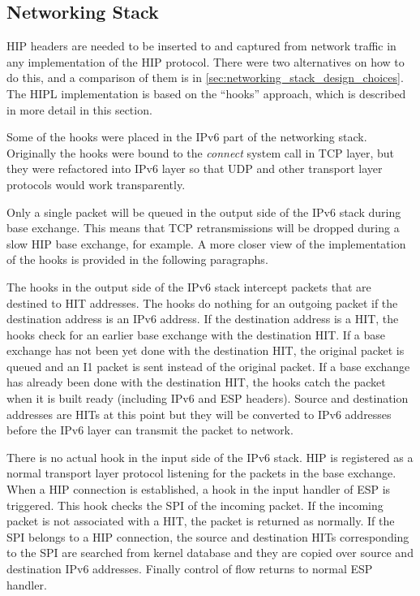 \subsection{Networking Stack}
\label{sec:networking_stack_architecture}

HIP headers are needed to be inserted to and captured from network
traffic in any implementation of the HIP protocol. There were two
alternatives on how to do this, and a comparison of them is in
\autoref{sec:networking_stack_design_choices}. The HIPL implementation
is based on the ``hooks'' approach, which is described in more detail
in this section.

Some of the hooks were placed in the IPv6 part of the networking
stack. Originally the hooks were bound to the \textit{connect} system
call in TCP layer, but they were refactored into IPv6 layer so that
UDP and other transport layer protocols would work transparently.

Only a single packet will be queued in the output side of the IPv6
stack during base exchange. This means that TCP retransmissions will
be dropped during a slow HIP base exchange, for example. A more closer
view of the implementation of the hooks is provided in the following
paragraphs.

The hooks in the output side of the IPv6 stack intercept packets that
are destined to HIT addresses. The hooks do nothing for an outgoing
packet if the destination address is an IPv6 address. If the
destination address is a HIT, the hooks check for an earlier base
exchange with the destination HIT. If a base exchange has not been yet
done with the destination HIT, the original packet is queued and an I1
packet is sent instead of the original packet. If a base exchange has
already been done with the destination HIT, the hooks catch the packet
when it is built ready (including IPv6 and ESP headers). Source and
destination addresses are HITs at this point but they will be
converted to IPv6 addresses before the IPv6 layer can transmit the
packet to network.

There is no actual hook in the input side of the IPv6 stack. HIP is
registered as a normal transport layer protocol listening for the
packets in the base exchange. When a HIP connection is established, a
hook in the input handler of ESP is triggered. This hook checks the
SPI of the incoming packet. If the incoming packet is not associated
with a HIT, the packet is returned as normally. If the SPI belongs to
a HIP connection, the source and destination HITs corresponding to the
SPI are searched from kernel database and they are copied over source
and destination IPv6 addresses. Finally control of flow returns to
normal ESP handler.

